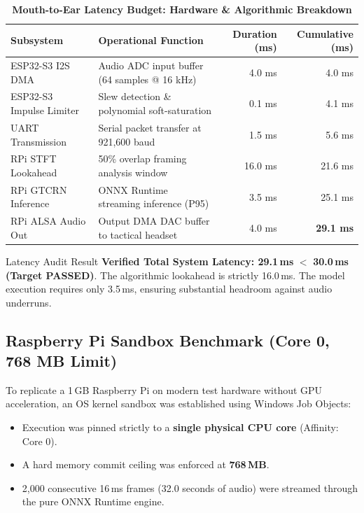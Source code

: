 \documentclass[11pt,a4paper]{article}
\begin{document}
\begin{table}[h]
\centering
\small
\caption{\textbf{Mouth-to-Ear Latency Budget: Hardware \& Algorithmic Breakdown}}
\vspace{4pt}
\begin{tabularx}{\textwidth}{l X r r}
\toprule
\textbf{Subsystem} & \textbf{Operational Function} & \textbf{Duration (ms)} & \textbf{Cumulative (ms)} \\
\midrule
ESP32-S3 I2S DMA & Audio ADC input buffer (64 samples @ 16 kHz) & 4.0 ms & 4.0 ms \\
ESP32-S3 Impulse Limiter & Slew detection \& polynomial soft-saturation & 0.1 ms & 4.1 ms \\
UART Transmission & Serial packet transfer at 921,600 baud & 1.5 ms & 5.6 ms \\
RPi STFT Lookahead & 50\% overlap framing analysis window & 16.0 ms & 21.6 ms \\
RPi GTCRN Inference & ONNX Runtime streaming inference (P95) & 3.5 ms & 25.1 ms \\
RPi ALSA Audio Out & Output DMA DAC buffer to tactical headset & 4.0 ms & \textbf{29.1 ms} \\
\bottomrule
\end{tabularx}
\label{tab:latency_budget}
\end{table}

\begin{calloutbox}[tacticalteal]{Latency Audit Result}
\textbf{Verified Total System Latency: 29.1\,ms} $\boldsymbol{<}$ \textbf{30.0\,ms (Target PASSED)}. The algorithmic lookahead is strictly 16.0\,ms. The model execution requires only 3.5\,ms, ensuring substantial headroom against audio underruns.
\end{calloutbox}

\subsection{Raspberry Pi Sandbox Benchmark (Core 0, 768 MB Limit)}
To replicate a 1\,GB Raspberry Pi on modern test hardware without GPU acceleration, an OS kernel sandbox was established using Windows Job Objects:
\begin{itemize}
    \item Execution was pinned strictly to a \textbf{single physical CPU core} (Affinity: Core 0).
    \item A hard memory commit ceiling was enforced at \textbf{768\,MB}.
    \item 2,000 consecutive 16\,ms frames (32.0 seconds of audio) were streamed through the pure ONNX Runtime engine.
\end{itemize}
\end{document}
